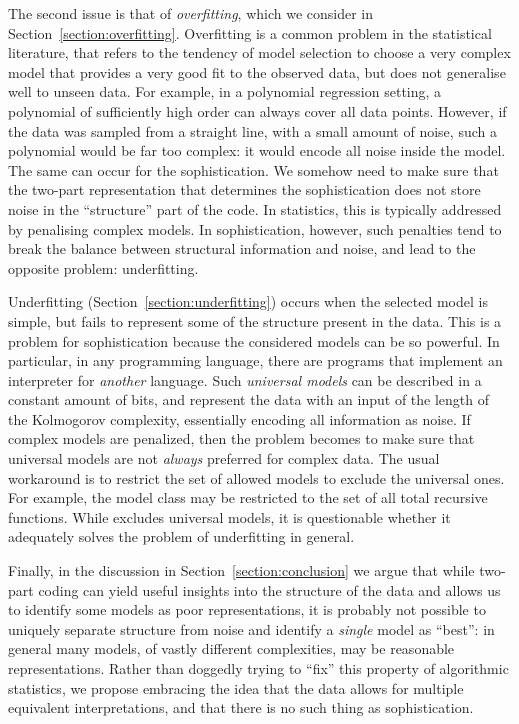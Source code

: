\documentclass{style/llncs}
\begin{document}
The second issue is that of \emph{overfitting}, which we consider in Section~\ref{section:overfitting}. Overfitting is a common problem in the statistical literature, that refers to the tendency of model selection to choose a very complex model that provides a very good fit to the observed data, but does not generalise well to unseen data. For example, in a polynomial regression setting, a polynomial of sufficiently high order can always cover all data points. However, if the data was sampled from a straight line, with a small amount of noise, such a polynomial would be far too complex: it would encode all noise inside the model. The same can occur for the sophistication. We somehow need to make sure that the two-part representation that determines the sophistication does not store noise in the ``structure'' part of the code. In statistics, this is typically addressed by penalising complex models. In sophistication, however, such penalties tend to break the balance between structural information and noise, and lead to the opposite problem: underfitting.

Underfitting (Section~\ref{section:underfitting}) occurs when the selected model is simple, but fails to represent some of the structure present in the data. This is a problem for sophistication because the considered models can be so powerful. In particular, in any programming language, there are programs that implement an interpreter for \emph{another} language. Such \emph{universal models} can be described in a constant amount of bits, and  represent the data with an input of the length of the Kolmogorov complexity, essentially encoding all information as noise. If complex models are penalized, then the problem becomes to make sure that universal models are not \emph{always} preferred for complex data. The usual workaround is to restrict the set of allowed models to exclude the universal ones. For example, the model class may be restricted to the set of all total recursive functions. While excludes universal models, it is questionable whether it adequately solves the problem of underfitting in general.

Finally, in the discussion in Section~\ref{section:conclusion} we argue that while two-part coding can yield useful insights into the structure of the data and allows us to identify some models as poor representations, it is probably not possible to uniquely separate structure from noise and identify a \emph{single} model as ``best'': in general many models, of vastly different complexities, may be reasonable representations. Rather than doggedly trying to ``fix'' this property of algorithmic statistics, we propose embracing the idea that the data allows for multiple equivalent interpretations, and that there is no such thing as sophistication.
\end{document}
